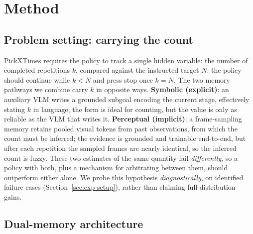\documentclass{article}
\begin{document}
\section{Method}
\label{sec:method}

\subsection{Problem setting: carrying the count}
\label{sec:method-setting}

PickXTimes requires the policy to track a single hidden variable: the number of completed repetitions $k$, compared against the instructed target $N$: the policy should continue while $k<N$ and press stop once $k=N$. The two memory pathways we combine carry $k$ in opposite ways. \textbf{Symbolic (explicit)}: an auxiliary VLM writes a grounded subgoal encoding the current stage, effectively stating $k$ in language; the form is ideal for counting, but the value is only as reliable as the VLM that writes it. \textbf{Perceptual (implicit)}: a frame-sampling memory retains pooled visual tokens from past observations, from which the count must be inferred; the evidence is grounded and trainable end-to-end, but after each repetition the sampled frames are nearly identical, so the inferred count is fuzzy. These two estimates of the same quantity fail \emph{differently}, so a policy with both, plus a mechanism for arbitrating between them, should outperform either alone. We probe this hypothesis \emph{diagnostically}, on identified failure cases (Section~\ref{sec:exp-setup}), rather than claiming full-distribution gains.

\subsection{Dual-memory architecture}
\label{sec:method-arch}
\end{document}
